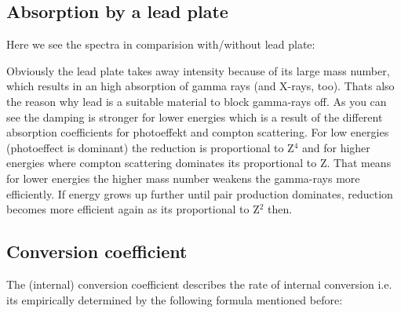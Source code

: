 \documentclass[bigchapter,colorback,accentcolor=tud4b,linedtoc,11pt]{tudreport}
\begin{document}
\subsection{Absorption by a lead plate}

Here we see the spectra in comparision with/without lead plate:

\begin{center}
\begin{figure}[H]
\end{figure}
\end{center}

Obviously the lead plate takes away intensity because of its large mass number, which results in an high absorption of gamma rays (and X-rays, too). Thats also the reason why lead is a suitable material to block gamma-rays off. As you can see the damping is stronger for lower energies which is a result of the different absorption coefficients for photoeffekt and compton scattering. For low energies (photoeffect is dominant) the reduction is proportional to Z$^4$ and for higher energies where compton scattering dominates its proportional to Z. That means for lower energies the higher mass number weakens the gamma-rays more efficiently. If energy grows up further until pair production dominates, reduction becomes more efficient again as its proportional to Z$^2$ then.

\subsection{Conversion coefficient}

The (internal) conversion coefficient describes the rate of internal conversion i.e. its empirically determined by the following formula mentioned before:
\end{document}
